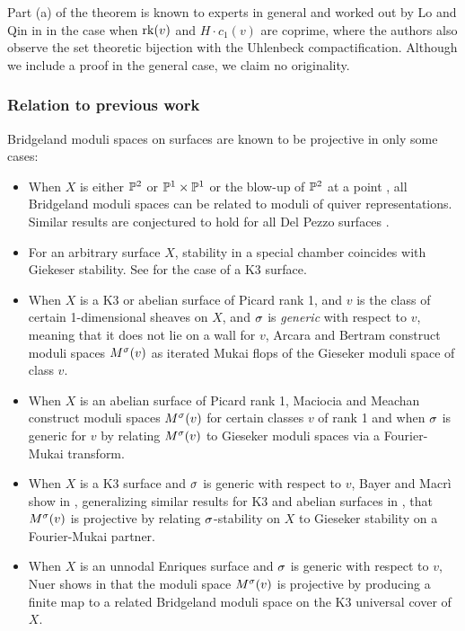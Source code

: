 \documentclass[letterpaper,11pt]{amsart}%
\theoremstyle{remark}
\begin{document}
Part (a) of the theorem is known to experts in general and worked out by Lo and Qin in \cite{LQ} in the case when $\operatorname{\mathrm{rk}}(v)$ and $H \cdot c_1(v)$ are coprime, where the authors also observe the set theoretic bijection with the Uhlenbeck compactification. Although we include a proof in the general case, we claim no originality.

\subsubsection*{Relation to previous work}
Bridgeland moduli spaces on surfaces are known to be projective in only some cases:
\begin{itemize}
    \item When $X$ is either $\mathbb{P}^2$ \cite{ABCH} or $\mathbb{P}^1 \times \mathbb{P}^1$ or the blow-up of $\mathbb{P}^2$ at a point \cite{AM}, all Bridgeland moduli spaces can be related to moduli of quiver representations. Similar results are conjectured to hold for all Del Pezzo surfaces \cite{AM}.
    
    \item For an arbitrary surface $X$, stability in a special chamber coincides with Giekeser stability. See \cite{bridgelandK3} for the case of a K3 surface.
    
    \item When $X$ is a K3 or abelian surface of Picard rank 1, and $v$ is the class of certain 1-dimensional sheaves on $X$, and $\sigma$ is \textit{generic} with respect to $v$, meaning that it does not lie on a wall for $v$, Arcara and Bertram \cite{ABL13} construct moduli spaces $M^\sigma(v)$ as iterated Mukai flops of the Gieseker moduli space of class $v$.
    
    \item When $X$ is an abelian surface of Picard rank 1, Maciocia and Meachan \cite{MM} construct moduli spaces $M^\sigma(v)$ for certain classes $v$ of rank 1 and when $\sigma$ is generic for $v$ by relating $M^\sigma(v)$ to Gieseker moduli spaces via a Fourier-Mukai transform.
    
    \item When $X$ is a K3 surface and $\sigma$ is generic with respect to $v$, Bayer and Macr\`i show in \cite{BM}, generalizing similar results for K3 and abelian surfaces in \cite{mmy}, that $M^\sigma(v)$ is projective by relating $\sigma$-stability on $X$ to Gieseker stability on a Fourier-Mukai partner. 
    
    \item When $X$ is an unnodal Enriques surface and $\sigma$ is generic with respect to $v$, Nuer shows in \cite{nuer} that the moduli space $M^\sigma(v)$ is projective by producing a finite map to a related Bridgeland moduli space on the K3 universal cover of $X$.
    
\end{itemize} 
\end{document}
